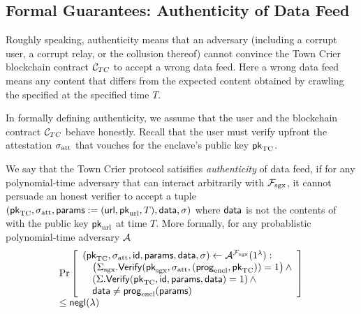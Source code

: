 \subsection{Formal Guarantees: Authenticity of Data Feed}
Roughly speaking, authenticity means that 
an adversary (including a corrupt
user, a corrupt relay, or the collusion thereof)
cannot convince   
the Town Crier blockchain contract 
${\cal C}_{TC}$ to accept 
a wrong data feed. 
Here a wrong data feed means any content
that differs from the expected content
obtained by crawling the specified \weburl at 
the specified time $T$.

In formally defining 
authenticity, 
we assume that the user and the blockchain
contract ${\cal C}_{TC}$ behave honestly.
Recall that the user must verify 
upfront the attestation ${\sigma_{\textrm{att}}}$ 
that vouches 
for the enclave's public key ${\sf pk}_{\textrm{TC}}$.


\begin{definition}[Authenticity]
We say that the Town Crier protocol 
satisifies {\it authenticity} of data feed,
if for any polynomial-time adversary
that can interact arbitrarily with $\mathcal{F}_{\textrm{sgx}}$,
it cannot 
persuade an honest verifier to accept
a tuple $({\sf pk}_{\textrm{TC}}, {\sigma_{\textrm{att}}}, {\sf params}:=({{\sf url}}, {\sf pk}_{\textrm{url}}, T), {\sf data}, \sigma)$
where ${\sf data}$ is not 
the contents of 
\weburl with the public key ${\sf pk}_{\textrm{url}}$ at time $T$.
More formally, 
for any probablistic polynomial-time adversary $\mathcal{A}$
\[
\begin{array}{l}
\Pr\left[
\begin{array}{l}
({\sf pk}_{\textrm{TC}}, {\sigma_{\textrm{att}}}, {\sf id}, {\sf params}, {\sf data}, \sigma) \leftarrow 
\mathcal{A}^{\mathcal{F}_{\textrm{sgx}}}(1^\lambda) :\\
\quad \left({\Sigma_{\textrm{sgx}}}.{\sf Verify}({\sf pk}_{\mathrm{sgx}}, {\sigma_{\textrm{att}}}, ({\sf prog}_{\textrm{encl}}, {\sf pk}_{\textrm{TC}})) = 1\right) \wedge \\
\quad \left(\Sigma.{\sf Verify}({\sf pk}_{\textrm{TC}}, {\sf id}, {\sf params}, {\sf data})  = 1\right) \wedge\\
\quad {\sf data} \neq {\sf prog}_{\textrm{encl}}({\sf params}) 
\end{array}
\right] \\[3pt] 
\leq {\sf negl}(\lambda)
\end{array}
\]
\label{defn:auth}
\end{definition}



